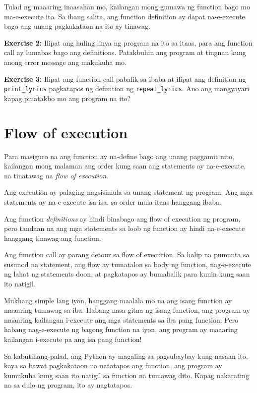 \documentclass[10pt,]{book}
\begin{document}

Tulad ng maaaring inaasahan mo, kailangan mong gumawa ng function bago
mo ma-e-execute ito. Sa ibang salita, ang function definition ay dapat
na-e-execute bago ang unang pagkakataon na ito ay tinawag.

\textbf{Exercise 2:} Ilipat ang huling linya ng program na ito sa itaas,
para ang function call ay lumabas bago ang definitions. Patakbuhin ang
program at tingnan kung anong error message ang makukuha mo.

\textbf{Exercise 3:} Ilipat ang function call pabalik sa ibaba at ilipat
ang definition ng \texttt{print\_lyrics} pagkatapos ng definition ng
\texttt{repeat\_lyrics}. Ano ang mangyayari kapag pinatakbo mo ang
program na ito?

\section{Flow of execution}\label{flow-of-execution}


Para masiguro na ang function ay na-define bago ang unang paggamit nito,
kailangan mong malaman ang order kung saan ang statements ay
na-e-execute, na tinatawag na \emph{flow of execution}.

Ang execution ay palaging nagsisimula sa unang statement ng program. Ang
mga statements ay na-e-execute isa-isa, sa order mula itaas hanggang
ibaba.

Ang function \emph{definitions} ay hindi binabago ang flow of execution
ng program, pero tandaan na ang mga statements sa loob ng function ay
hindi na-e-execute hanggang tinawag ang function.

Ang function call ay parang detour sa flow of execution. Sa halip na
pumunta sa susunod na statement, ang flow ay tumatalon sa body ng
function, nag-e-execute ng lahat ng statements doon, at pagkatapos ay
bumabalik para kunin kung saan ito natigil.

Mukhang simple lang iyon, hanggang maalala mo na ang isang function ay
maaaring tumawag sa iba. Habang nasa gitna ng isang function, ang
program ay maaaring kailangan i-execute ang mga statements sa iba pang
function. Pero habang nag-e-execute ng bagong function na iyon, ang
program ay maaaring kailangan i-execute pa ang isa pang function!

Sa kabutihang-palad, ang Python ay magaling sa pagsubaybay kung nasaan
ito, kaya sa bawat pagkakataon na natatapos ang function, ang program ay
kumukuha kung saan ito natigil sa function na tumawag dito. Kapag
nakarating na sa dulo ng program, ito ay nagtatapos.
\end{document}
